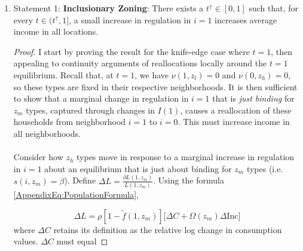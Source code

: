 \documentclass[12pt]{article}
\begin{document}
\begin{enumerate}
		 
		
		
		\item Statement 1: \textbf{Inclusionary Zoning}: There exists a $t^{\uparrow} \in [0, 1]$ such that, for every $t \in (t^{\uparrow}, 1]$, a small increase in regulation in $i = 1$ increases average income in all locations.
		
		\begin{proof}
			I start by proving the result for the knife-edge case where $t = 1$, then appealing to continuity arguments of reallocations locally around the $t = 1$ equilibrium. Recall that, at $t = 1$, we have $\nu(1, z_{l}) = 0$ and $\nu(0, z_{h}) = 0$, so these types are fixed in their respective neighborhoods. It is then sufficient to show that a marginal change in regulation in $i = 1$ that is \textit{just binding} for $z_{m}$ types, captured through changes in $I(1)$, causes a reallocation of these households from neighborhood $i = 1$ to $i = 0$. This must increase income in all neighborhoods. 
			
			
			\paragraph*{}
			Consider how $z_{h}$ types move in response to a marginal increase in regulation in $i=1$ about an equilibrium that is just about binding for $z_{m}$ types (i.e. $s(i, z_{m}) = \beta$). Define $\Delta L = \frac{\partial L(1, z_{m})}{L(1, z_{m})}$.  Using the formula \eqref{AppendixEq:PopulationFormula},
			
			\begin{equation*}
					\Delta L = \rho[1 - \tilde{f}(1, z_{m})]\big[ \Delta C + \Omega(z_{m})\Delta \text{Inc} \big]
			\end{equation*}
			where $\Delta C$ retains its definition as the relative log change in consumption values. $\Delta C$ must equal
			

\end{proof}
\end{enumerate}
\end{document}
